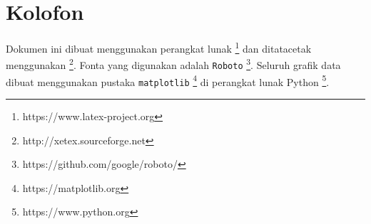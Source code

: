 \markboth{}{}
\section*{Kolofon}
Dokumen ini dibuat menggunakan perangkat lunak \LaTeXe \footnote{https://www.latex-project.org} dan ditatacetak menggunakan \XeLaTeX \footnote{http://xetex.sourceforge.net}. Fonta yang digunakan adalah \texttt{Roboto} \footnote{https://github.com/google/roboto/}. Seluruh grafik data dibuat menggunakan pustaka \texttt{matplotlib} \footnote{https://matplotlib.org} di perangkat lunak Python \footnote{https://www.python.org}. 

